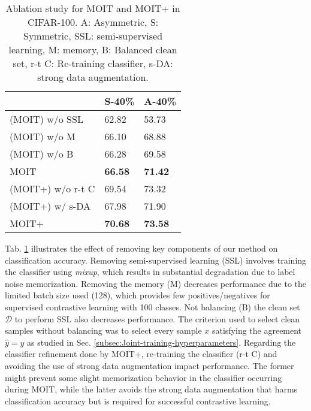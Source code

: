 \documentclass[final]{cvpr}
\begin{document}
\begin{table}[t]
\begin{centering}
\caption{\label{tab:AblationJoint}Ablation study for MOIT and MOIT+ in CIFAR-100.
A: Asymmetric, S: Symmetric, SSL: semi-supervised learning, M: memory,
B: Balanced clean set, r-t C: Re-training classifier, s-DA: strong
data augmentation.}
\medskip{}
{\small{}}{\small\par}
\par\end{centering}
\centering{}{\small{}}\begin{tabularx}{\columnwidth}{Xll}
\toprule 
 & {\small{}S-40\%} & {\small{}A-40\%}\tabularnewline
\midrule 
{\small{}(MOIT) w/o SSL} & {\small{}62.82} & {\small{}53.73}\tabularnewline

{\small{}(MOIT) w/o M} & {\small{}66.10} & {\small{}68.88}\tabularnewline

{\small{}(MOIT) w/o B} & {\small{}66.28} & {\small{}69.58}\tabularnewline

{\small{}MOIT} & \textbf{\small{}66.58} & \textbf{\small{}71.42}\tabularnewline
\midrule
{\small{}(MOIT+) w/o r-t C} & {\small{}69.54} & {\small{}73.32}\tabularnewline

{\small{}(MOIT+) w/ s-DA} & {\small{}67.98} & {\small{}71.90}\tabularnewline

{\small{}MOIT+} & \textbf{\small{}70.68} & \textbf{\small{}73.58}\tabularnewline
\bottomrule
\end{tabularx}{\small{}}{\small\par}
\end{table}
Tab. \ref{tab:AblationJoint} illustrates the effect of removing key components of our method on classification accuracy. Removing semi-supervised learning (SSL) involves training the classifier using \textit{mixup}, which results in substantial degradation due to label noise memorization. Removing the memory (M) decreases performance due to the limited batch size used (128), which provides few positives/negatives for supervised contrastive learning with 100 classes. Not balancing (B) the clean set $\mathcal{D}$ to perform SSL also decreases performance. The criterion used to select clean samples without balancing was to select every sample $x$ satisfying the agreement $\hat{y}=y$ as studied in Sec. \ref{subsec:Joint-training-hyperparameters}. Regarding the classifier refinement done by MOIT+, re-training the classifier (r-t C) and avoiding the use of strong data augmentation impact performance. The former might prevent some slight memorization behavior in the classifier occurring during MOIT, while the latter avoids the strong data augmentation that harms classification accuracy but is required for successful contrastive learning. 
\end{document}
